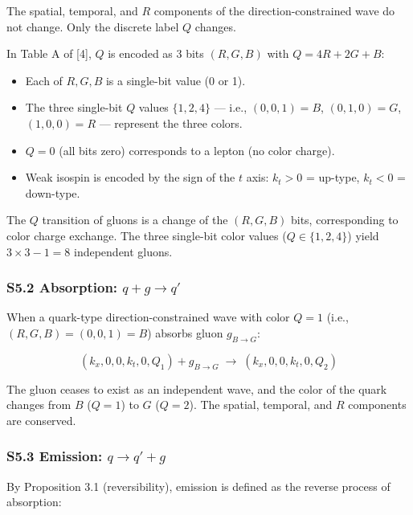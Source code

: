 \documentclass[
  a4paper,11pt]{article}
\providecommand{\tightlist}{%
  \setlength{\itemsep}{0pt}\setlength{\parskip}{0pt}}
\theoremstyle{definition}
\theoremstyle{remark}
\begin{document}
The spatial, temporal, and \(R\) components of the direction-constrained
wave do not change. Only the discrete label \(Q\) changes.

In Table A of {[}4{]}, \(Q\) is encoded as 3 bits \((R, G, B)\) with
\(Q = 4R + 2G + B\):

\begin{itemize}
\tightlist
\item
  Each of \(R, G, B\) is a single-bit value (0 or 1).
\item
  The three single-bit \(Q\) values \(\{1, 2, 4\}\) --- i.e.,
  \((0,0,1) = B\), \((0,1,0) = G\), \((1,0,0) = R\) --- represent the
  three colors.
\item
  \(Q = 0\) (all bits zero) corresponds to a lepton (no color charge).
\item
  Weak isospin is encoded by the sign of the \(t\) axis: \(k_t > 0\) =
  up-type, \(k_t < 0\) = down-type.
\end{itemize}

The \(Q\) transition of gluons is a change of the \((R, G, B)\) bits,
corresponding to color charge exchange. The three single-bit color
values (\(Q \in \{1, 2, 4\}\)) yield \(3 \times 3 - 1 = 8\) independent
gluons.

\subsubsection{\texorpdfstring{S5.2 Absorption:
\(q + g \to q'\)}{S5.2 Absorption: q + g \textbackslash to q\textquotesingle{}}}\label{s5.2-absorption-q-g-to-q}

When a quark-type direction-constrained wave with color \(Q = 1\) (i.e.,
\((R,G,B) = (0,0,1) = B\)) absorbs gluon \(g_{B \to G}\):

\[(k_x, 0, 0, k_t, 0, Q_{1}) + g_{B \to G} \;\longrightarrow\; (k_x, 0, 0, k_t, 0, Q_{2})\]

The gluon ceases to exist as an independent wave, and the color of the
quark changes from \(B\) (\(Q = 1\)) to \(G\) (\(Q = 2\)). The spatial,
temporal, and \(R\) components are conserved.

\subsubsection{\texorpdfstring{S5.3 Emission:
\(q \to q' + g\)}{S5.3 Emission: q \textbackslash to q\textquotesingle{} + g}}\label{s5.3-emission-q-to-q-g}

By Proposition 3.1 (reversibility), emission is defined as the reverse
process of absorption:
\end{document}
